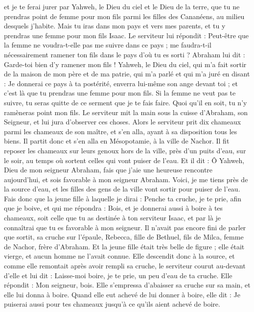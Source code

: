 \begin{multicols}{2}
et je te ferai jurer par Yahweh, le Dieu du ciel et le Dieu de la terre, que tu ne prendras point de femme pour mon fils parmi les filles des Cananéens, au milieu desquels j'habite.
Mais tu iras dans mon pays et vers mes parents, et tu y prendras une femme pour mon fils Isaac.
Le serviteur lui répondit : Peut-être que la femme ne voudra-t-elle pas me suivre dans ce pays ; me faudra-t-il nécessairement ramener ton fils dans le pays d'où tu es sorti ?
Abraham lui dit : Garde-toi bien d'y ramener mon fils !
Yahweh, le Dieu du ciel, qui m'a fait sortir de la maison de mon père et de ma patrie, qui m'a parlé et qui m'a juré en disant : Je donnerai ce pays à ta postérité, enverra lui-même son ange devant toi ; et c'est là que tu prendras une femme pour mon fils.
Si la femme ne veut pas te suivre, tu seras quitte de ce serment que je te fais faire. Quoi qu'il en soit, tu n'y ramèneras point mon fils.
Le serviteur mit la main sous la cuisse d'Abraham, son Seigneur, et lui jura d'observer ces choses.
Alors le serviteur prit dix chameaux parmi les chameaux de son maître, et s'en alla, ayant à sa disposition tous les biens. Il partit donc et s'en alla en Mésopotamie, à la ville de Nachor.
Il fit reposer les chameaux sur leurs genoux hors de la ville, près d'un puits d'eau, sur le soir, au temps où sortent celles qui vont puiser de l'eau.
Et il dit : Ô Yahweh, Dieu de mon seigneur Abraham, fais que j'aie une heureuse rencontre aujourd'hui, et sois favorable à mon seigneur Abraham.
Voici, je me tiens près de la source d'eau, et les filles des gens de la ville vont sortir pour puiser de l'eau.
Fais donc que la jeune fille à laquelle je dirai : Penche ta cruche, je te prie, afin que je boive, et qui me répondra : Bois, et je donnerai aussi à boire à tes chameaux, soit celle que tu as destinée à ton serviteur Isaac, et par là je connaîtrai que tu es favorable à mon seigneur.
Il n'avait pas encore fini de parler que sortit, sa cruche sur l'épaule, Rebecca, fille de Bethuel, fils de Milca, femme de Nachor, frère d'Abraham.
Et la jeune fille était très belle de figure ; elle était vierge, et aucun homme ne l'avait connue. Elle descendit donc à la source, et comme elle remontait après avoir rempli sa cruche,
le serviteur courut au-devant d'elle et lui dit : Laisse-moi boire, je te prie, un peu d'eau de ta cruche.
Elle répondit : Mon seigneur, bois. Elle s'empressa d'abaisser sa cruche sur sa main, et elle lui donna à boire.
Quand elle eut achevé de lui donner à boire, elle dit : Je puiserai aussi pour tes chameaux jusqu'à ce qu'ils aient achevé de boire.

\end{multicols}
